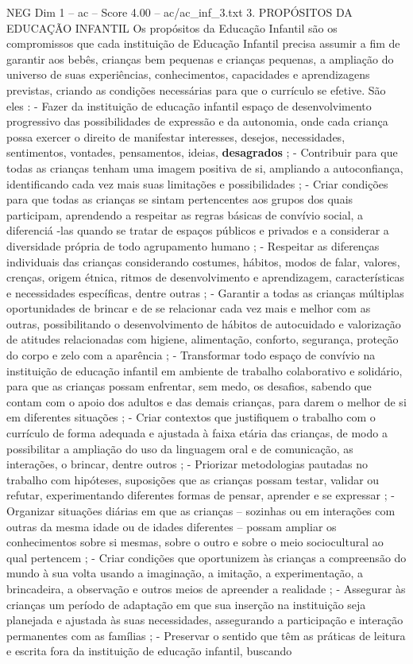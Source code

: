 \begin{textsample}{NEG Dim 1 – ac – Score 4.00 – ac/ac\_inf\_3.txt}  \label{ex:f1_neg_117}
3.
PROPÓSITOS DA EDUCAÇÃO INFANTIL Os propósitos da Educação Infantil são os compromissos que cada instituição de Educação Infantil precisa assumir a fim de garantir aos bebês, crianças bem pequenas e crianças pequenas, a ampliação do universo de suas experiências, conhecimentos, capacidades e aprendizagens previstas, criando as condições necessárias para que o currículo se efetive.
São eles : - Fazer da instituição de educação infantil espaço de desenvolvimento progressivo das possibilidades de expressão e da autonomia, onde cada criança possa exercer o direito de manifestar interesses, desejos, necessidades, sentimentos, vontades, pensamentos, ideias, \textbf{desagrados} ; - Contribuir para que todas as crianças tenham uma imagem positiva de si, ampliando a autoconfiança, identificando cada vez mais suas limitações e possibilidades ; - Criar condições para que todas as crianças se sintam pertencentes aos grupos dos quais participam, aprendendo a respeitar as regras básicas de convívio social, a diferenciá -las quando se tratar de espaços públicos e privados e a considerar a diversidade própria de todo agrupamento humano ; - Respeitar as diferenças individuais das crianças considerando costumes, hábitos, modos de falar, valores, crenças, origem étnica, ritmos de desenvolvimento e aprendizagem, características e necessidades específicas, dentre outras ; - Garantir a todas as crianças múltiplas oportunidades de brincar e de se relacionar cada vez mais e melhor com as outras, possibilitando o desenvolvimento de hábitos de autocuidado e valorização de atitudes relacionadas com higiene, alimentação, conforto, segurança, proteção do corpo e zelo com a aparência ; - Transformar todo espaço de convívio na instituição de educação infantil em ambiente de trabalho colaborativo e solidário, para que as crianças possam enfrentar, sem medo, os desafios, sabendo que contam com o apoio dos adultos e das demais crianças, para darem o melhor de si em diferentes situações ; - Criar contextos que justifiquem o trabalho com o currículo de forma adequada e ajustada à faixa etária das crianças, de modo a possibilitar a ampliação do uso da linguagem oral e de comunicação, as interações, o brincar, dentre outros ; - Priorizar metodologias pautadas no trabalho com hipóteses, suposições que as crianças possam testar, validar ou refutar, experimentando diferentes formas de pensar, aprender e se expressar ; - Organizar situações diárias em que as crianças – sozinhas ou em interações com outras da mesma idade ou de idades diferentes – possam ampliar os conhecimentos sobre si mesmas, sobre o outro e sobre o meio sociocultural ao qual pertencem ; - Criar condições que oportunizem às crianças a compreensão do mundo à sua volta usando a imaginação, a imitação, a experimentação, a brincadeira, a observação e outros meios de apreender a realidade ; - Assegurar às crianças um período de adaptação em que sua inserção na instituição seja planejada e ajustada às suas necessidades, assegurando a participação e interação permanentes com as famílias ; - Preservar o sentido que têm as práticas de leitura e escrita fora da instituição de educação infantil, buscando 
\end{textsample}
